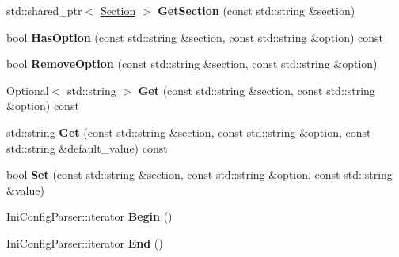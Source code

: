 \begin{DoxyCompactItemize}
\item 
std\+::shared\+\_\+ptr$<$ \hyperlink{classlog2hdfs_1_1Section}{Section} $>$ {\bfseries Get\+Section} (const std\+::string \&section)\hypertarget{classlog2hdfs_1_1IniConfigParser_aeee13031c12b4d3fdf857acd3347f0d8}{}\label{classlog2hdfs_1_1IniConfigParser_aeee13031c12b4d3fdf857acd3347f0d8}

\item 
bool {\bfseries Has\+Option} (const std\+::string \&section, const std\+::string \&option) const \hypertarget{classlog2hdfs_1_1IniConfigParser_a280e18ede56472f6325d00fe34271a6c}{}\label{classlog2hdfs_1_1IniConfigParser_a280e18ede56472f6325d00fe34271a6c}

\item 
bool {\bfseries Remove\+Option} (const std\+::string \&section, const std\+::string \&option)\hypertarget{classlog2hdfs_1_1IniConfigParser_abf3278e73c150db0fb091b7d9ed15da0}{}\label{classlog2hdfs_1_1IniConfigParser_abf3278e73c150db0fb091b7d9ed15da0}

\item 
\hyperlink{classlog2hdfs_1_1Optional}{Optional}$<$ std\+::string $>$ {\bfseries Get} (const std\+::string \&section, const std\+::string \&option) const \hypertarget{classlog2hdfs_1_1IniConfigParser_a0930726f5c508fd9684c0758e02bc1aa}{}\label{classlog2hdfs_1_1IniConfigParser_a0930726f5c508fd9684c0758e02bc1aa}

\item 
std\+::string {\bfseries Get} (const std\+::string \&section, const std\+::string \&option, const std\+::string \&default\+\_\+value) const \hypertarget{classlog2hdfs_1_1IniConfigParser_af3e496884b1f0c5820c941b8d21b6e9d}{}\label{classlog2hdfs_1_1IniConfigParser_af3e496884b1f0c5820c941b8d21b6e9d}

\item 
bool {\bfseries Set} (const std\+::string \&section, const std\+::string \&option, const std\+::string \&value)\hypertarget{classlog2hdfs_1_1IniConfigParser_a1b8deba703a74c1539295760a7e794ee}{}\label{classlog2hdfs_1_1IniConfigParser_a1b8deba703a74c1539295760a7e794ee}

\item 
Ini\+Config\+Parser\+::iterator {\bfseries Begin} ()\hypertarget{classlog2hdfs_1_1IniConfigParser_a514a95d5e7f8f3d1119d446e0a5bc39d}{}\label{classlog2hdfs_1_1IniConfigParser_a514a95d5e7f8f3d1119d446e0a5bc39d}

\item 
Ini\+Config\+Parser\+::iterator {\bfseries End} ()\hypertarget{classlog2hdfs_1_1IniConfigParser_a3bbc39cd2701e0411065328285faef37}{}\label{classlog2hdfs_1_1IniConfigParser_a3bbc39cd2701e0411065328285faef37}


\end{DoxyCompactItemize}
